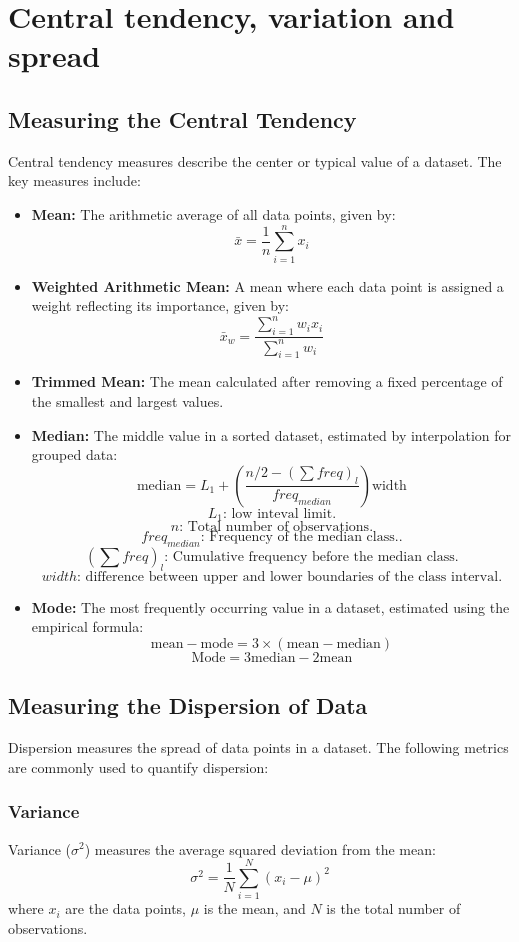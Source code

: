 \documentclass[a4paper,12pt]{article}
\begin{document}
\section{Central tendency, variation and spread}
\subsection{Measuring the Central Tendency}
Central tendency measures describe the center or typical value of a dataset. The key measures include:

\begin{itemize}
    \item \textbf{Mean:} The arithmetic average of all data points, given by:
    \[ \bar{x} = \frac{1}{n} \sum_{i=1}^{n} x_i \]
    \item \textbf{Weighted Arithmetic Mean:} A mean where each data point is assigned a weight reflecting its importance, given by:
    \[ \bar{x}_w = \frac{\sum_{i=1}^{n} w_i x_i}{\sum_{i=1}^{n} w_i} \]
    \item \textbf{Trimmed Mean:} The mean calculated after removing a fixed percentage of the smallest and largest values.
    \item \textbf{Median:} The middle value in a sorted dataset, estimated by interpolation for grouped data:
    \[ \text{median} = L_1 + \left( \frac{n/2 - ( \sum freq)_l}{freq_{median}} \right) \text{width} \]
    \[ L_1 \text{: low inteval limit.}  \]
    \[ n \text{: Total number of observations.}  \]
    \[ {freq_{median}}\text{: Frequency of the median class..}  \]
    \[ (\sum freq)_l \text{: Cumulative frequency before the median class.}  \]
    \[ width \text{: difference between upper and lower boundaries of the class interval.}  \]
    \item \textbf{Mode:} The most frequently occurring value in a dataset, estimated using the empirical formula:
    \[ \text{mean} - \text{mode} = 3 \times (\text{mean} - \text{median}) \]
    \[ \text{Mode} = 3 \text{median} - 2 \text{mean} \]
\end{itemize}

\subsection{Measuring the Dispersion of Data}

Dispersion measures the spread of data points in a dataset. The following metrics are commonly used to quantify dispersion:

\subsubsection{Variance}
Variance (\(\sigma^2\)) measures the average squared deviation from the mean:
\begin{equation}
\sigma^2 = \frac{1}{N} \sum_{i=1}^{N} (x_i - \mu)^2
\end{equation}
where \( x_i \) are the data points, \( \mu \) is the mean, and \( N \) is the total number of observations.
\end{document}
